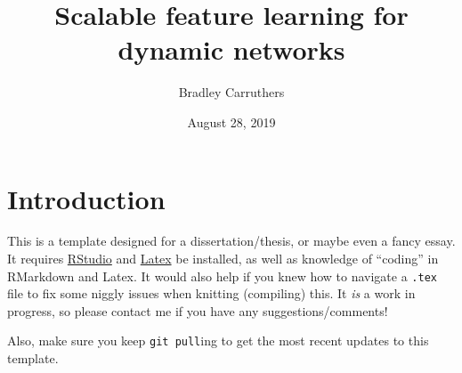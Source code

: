 \documentclass[12pt,preprint, authoryear]{article}
\title{Scalable feature learning for dynamic networks}
\author{Bradley Carruthers}
\date{August 28, 2019}
\numberwithin{equation}{section}
\numberwithin{figure}{section}
\numberwithin{table}{section}
\begin{document}
\pagestyle{fancy}
\chead{}
\rhead{}
\lfoot{}
\rfoot{} 
\lhead{}
\cfoot{\footnotesize \thepage\\}







\maketitle
\thispagestyle{empty}




\clearpage

\setcounter{page}{1}

\renewcommand{\contentsname}{Contents}
\hypersetup{linkcolor=black}
\tableofcontents
\newpage
\hypersetup{linkcolor=black}
\listoftables
\newpage
\hypersetup{linkcolor=black}
\listoffigures
\hypersetup{linkcolor=black}
\newpage


\renewcommand{\vec}[1]{\mathbf{#1}}



\section{\texorpdfstring{Introduction
\label{Intro}}{Introduction }}\label{introduction}

This is a template designed for a dissertation/thesis, or maybe even a
fancy essay. It requires
\href{https://www.rstudio.com/products/rstudio/download/}{RStudio} and
\href{https://www.latex-project.org/get/}{Latex} be installed, as well
as knowledge of ``coding'' in RMarkdown and Latex. It would also help if
you knew how to navigate a \texttt{.tex} file to fix some niggly issues
when knitting (compiling) this. It \emph{is} a work in progress, so
please contact me if you have any suggestions/comments!

Also, make sure you keep \texttt{git\ pull}ing to get the most recent
updates to this template.
\end{document}
